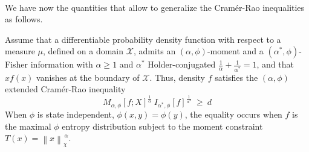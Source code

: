 \documentclass[entropy,article,submit,moreauthors,pdftex]{Definitions/mdpi}
\def\X{\mathcal{X}}%
\begin{document}
\

We  have  now   the  quantities  that  allow  to   generalize  the  Cram\'er-Rao
inequalities as follows.
%
\begin{Proposition}
\label{prop:np-phi-CR}
%
  Assume that  a differentiable probability  density function with respect  to a
  measure $\mu$, defined on a  domain $\X$, admits an $(\alpha,\phi)$-moment and
  a  $(\alpha^*,\phi)$-Fisher information  with  $\alpha \ge  1$ and  $\alpha^*$
  Holder-conjugated  $\frac{1}{\alpha} +  \frac{1}{\alpha^*} =  1$, and  that $x
  f(x)$  vanishes at  the boundary  of $\X$.   Thus, density  $f$ satisfies  the
  $(\alpha,\phi)$ extended Cram\'er-Rao inequality
  \begin{equation}\label{eq:np-phi-CR}
   M_{\alpha,\phi}[f;X]^{\frac{1}{\alpha}} \: I_{\alpha^*\!,\phi}[f]^{\frac{1}{\alpha^*}}
   \: \ge \: d
  \end{equation}
  When $\phi$ is  state independent, $\phi(x,y) = \phi(y)$,  the equality occurs
  when $f$  is the  maximal $\phi$  entropy distribution  subject to  the moment
  constraint $T(x) = \left\| x \right\|_{\chi}^{\, \alpha}$.
\end{Proposition}
\end{document}

